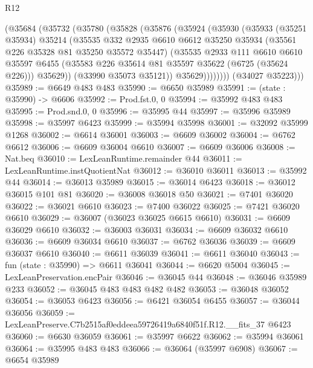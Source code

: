 \begin{lexlean}{R12}
\begin{coremodule}
          (@35684
            (@35732
              (@35780
                (@35828
                  (@35876
                    (@35924
                      (@35930
                        (@35933
                          (@35251 @35934)
                          @35214
                          (@35535
                            @332
                            @2935
                            @6610
                            @6612
                            @35250
                            @35934
                            (@35561 @226 @35328 @81 @35250 @35572 @35447)
                            (@35535
                              @2933
                              @111
                              @6610
                              @6610
                              @35597
                              @6455
                              (@35583 @226 @35614 @81 @35597 @35622 (@6725 (@35624 @226)))
                              @35629))
                          (@33990 @35073 @35121))
                        @35629))))))))
        (@34027 @35223)))
@35989 := @6649 @483 @483
@35990 := @6650 @35989
@35991 := (state : @35990) -> @6606
@35992 := Prod.fst.{0, 0}
@35994 := @35992 @483 @483
@35995 := Prod.snd.{0, 0}
@35996 := @35995 @44
@35997 := @35996 @35989
@35998 := @35997 @6423
@35999 := @35994 @35998
@36001 := @32092 @35999 @1268
@36002 := @6614 @36001
@36003 := @6609 @36002
@36004 := @6762 @6612
@36006 := @6609 @36004 @6610
@36007 := @6609 @36006
@36008 := Nat.beq
@36010 := LexLeanRuntime.remainder @44
@36011 := LexLeanRuntime.instQuotientNat
@36012 := @36010 @36011
@36013 := @35992 @44
@36014 := @36013 @35989
@36015 := @36014 @6423
@36018 := @36012 @36015 @101 @81
@36020 := @36008 @36018 @50
@36021 := @7401 @36020
@36022 := @36021 @6610
@36023 := @7400 @36022
@36025 := @7421 @36020 @6610
@36029 := @36007 (@36023 @36025 @6615 @6610)
@36031 := @6609 @36029 @6610
@36032 := @36003 @36031
@36034 := @6609 @36032 @6610
@36036 := @6609 @36034 @6610
@36037 := @6762 @36036
@36039 := @6609 @36037 @6610
@36040 := @6611 @36039
@36041 := @6611 @36040
@36043 := fun (state : @35990) => @6611 @36041
@36044 := @6620 @5004
@36045 := LexLeanPreservation.encPair
@36046 := @36045 @44
@36048 := @36046 @35989 @233
@36052 := @36045 @483 @483 @482 @482
@36053 := @36048 @36052
@36054 := @36053 @6423
@36056 := @6421 @36054 @6455
@36057 := @36044 @36056
@36059 := LexLeanPreserve.C7b2515af0eddeea59726419a6840f51f.R12.__fits_37 @6423
@36060 := @6630 @36059
@36061 := @35997 @6622
@36062 := @35994 @36061
@36064 := @35995 @483 @483
@36066 := @36064 (@35997 @6908)
@36067 := @6654 @35989

\end{coremodule}
\end{lexlean}
